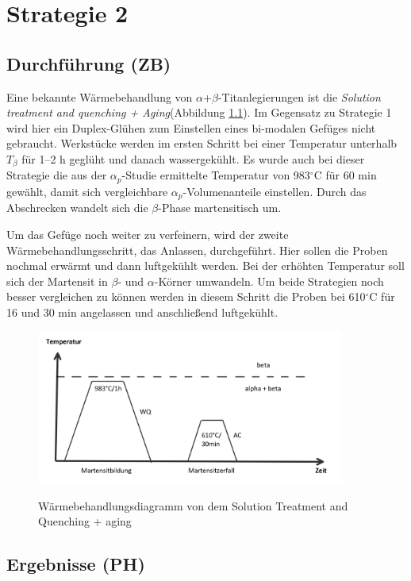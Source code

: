 \chapter{Strategie 2}

\section{Durchführung (ZB)}

Eine bekannte Wärmebehandlung von $\alpha$+$\beta$-Titanlegierungen ist die  \textit{Solution treatment and quenching + Aging}(Abbildung \ref{fig:SQ}). Im Gegensatz zu  Strategie 1 wird hier ein Duplex-Glühen zum Einstellen eines bi-modalen Gefüges nicht gebraucht. Werkstücke werden im ersten Schritt bei einer Temperatur unterhalb $T_{\beta}$ für 1--2 h geglüht und danach wassergekühlt. Es wurde auch bei dieser Strategie die aus der $\alpha_p$-Studie ermittelte Temperatur von 983$^\circ$C für 60 min gewählt, damit sich vergleichbare $\alpha_p$-Volumenanteile einstellen. Durch das Abschrecken wandelt sich die $\beta$-Phase martensitisch um.

Um das Gefüge noch weiter zu verfeinern, wird der zweite Wärmebehandlungsschritt, das Anlassen, durchgeführt. Hier sollen die Proben nochmal erwärmt und dann luftgekühlt werden. Bei der erhöhten Temperatur soll sich der Martensit in $\beta$- und $\alpha$-Körner umwandeln.
Um beide Strategien noch besser vergleichen zu können werden in diesem Schritt die Proben bei  610$^\circ$C für 16 und 30 min angelassen und anschließend luftgekühlt.

\begin{figure}[h]
	\centering
	{\includegraphics[width=0.9\textwidth]{./Bilder/SQ.png}}
	\caption{Wärmebehandlungsdiagramm von dem Solution Treatment and Quenching + aging}
	\label{fig:SQ}
\end{figure}

\section{Ergebnisse (PH)}

